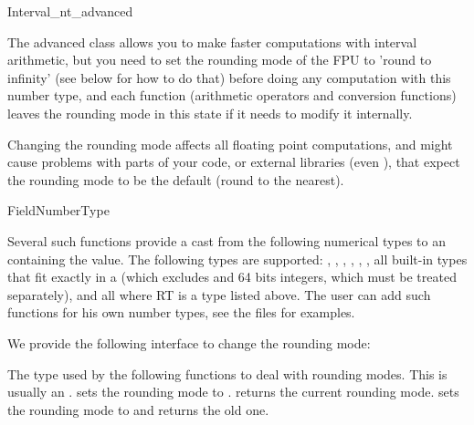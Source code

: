 \renewcommand\ccRefPageBegin{\begin{ccAdvanced}}
\renewcommand\ccRefPageEnd{\end{ccAdvanced}}
\begin{ccRefClass} {Interval_nt_advanced}
\label{interval-adv}

\ccDefinition

The advanced class allows you to make faster computations with interval 
arithmetic, but you need to set
the rounding mode of the FPU to 'round to infinity' (see below for how to do
that) before doing any computation with this number type, and each function
(arithmetic operators and conversion functions)
leaves the rounding mode in this state if it needs to modify it internally.

Changing the rounding mode affects all floating point computations, and might
cause problems with parts of your code, or external libraries (even \cgal),
that expect the rounding mode to be the default (round to the nearest).


\ccIsModel
FieldNumberType

\ccOperations

{Several such functions provide a cast from the following numerical types
to an  containing the value.  The following types are
supported: , , ,
, , , all built-in
types that fit exactly in a  (which excludes 
and 64 bits integers, which must be treated separately), and all
 where RT is a type listed above.
The user can add such functions for his own number types, see the files
 for examples.}


We provide the following interface to change the rounding mode:

       {The type used by the following functions to deal with rounding modes.
       This is usually an .}
       {sets the rounding mode to .}
       {returns the current rounding mode.}
       {sets the rounding mode to  and returns the old one. }


\end{ccRefClass}
